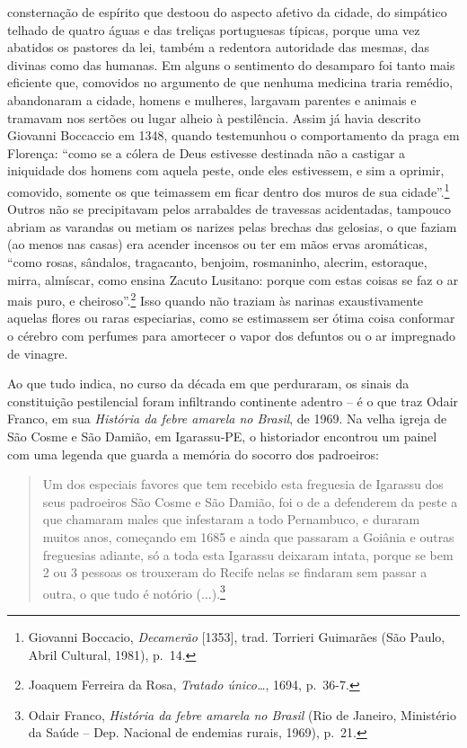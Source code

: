 consternação de espírito que destoou do aspecto afetivo da cidade, do
simpático telhado de quatro águas e das treliças portuguesas típicas,
porque uma vez abatidos os pastores da lei, também a redentora
autoridade das mesmas, das divinas como das humanas. Em alguns o
sentimento do desamparo foi tanto mais eficiente que, comovidos no
argumento de que nenhuma medicina traria remédio, abandonaram a cidade,
homens e mulheres, largavam parentes e animais e tramavam nos sertões ou
lugar alheio à pestilência. Assim já havia descrito Giovanni Boccaccio
em 1348, quando testemunhou o comportamento da praga em Florença: ``como
se a cólera de Deus estivesse destinada não a castigar a iniquidade dos
homens com aquela peste, onde eles estivessem, e sim a oprimir,
comovido, somente os que teimassem em ficar dentro dos muros de sua
cidade''.\footnote{Giovanni Boccacio, \emph{Decamerão} {[}1353{]}, trad.
  Torrieri Guimarães (São Paulo, Abril Cultural, 1981), p.~14.} Outros
não se precipitavam pelos arrabaldes de travessas acidentadas, tampouco
abriam as varandas ou metiam os narizes pelas brechas das gelosias, o
que faziam (ao menos nas casas) era acender incensos ou ter em mãos
ervas aromáticas, ``como rosas, sândalos, tragacanto, benjoim,
rosmaninho, alecrim, estoraque, mirra, almíscar, como ensina Zacuto
Lusitano: porque com estas coisas se faz o ar mais puro, e
cheiroso''.\footnote{Joaquem Ferreira da Rosa, \emph{Tratado
  único\ldots{}}, 1694, p.~36-7.} Isso quando não traziam às narinas
exaustivamente aquelas flores ou raras especiarias, como se estimassem
ser ótima coisa conformar o cérebro com perfumes para amortecer o vapor
dos defuntos ou o ar impregnado de vinagre.

Ao que tudo indica, no curso da década em que perduraram, os sinais da
constituição pestilencial foram infiltrando continente adentro -- é o
que traz Odair Franco, em sua \emph{História da febre amarela no
Brasil}, de 1969. Na velha igreja de São Cosme e São Damião, em
Igarassu-PE, o historiador encontrou um painel com uma legenda que
guarda a memória do socorro dos padroeiros:

\begin{quote}
Um dos especiais favores que tem recebido esta freguesia de Igarassu dos
seus padroeiros São Cosme e São Damião, foi o de a defenderem da peste a
que chamaram males que infestaram a todo Pernambuco, e duraram muitos
anos, começando em 1685 e ainda que passaram a Goiânia e outras
freguesias adiante, só a toda esta Igarassu deixaram intata, porque se
bem 2 ou 3 pessoas os trouxeram do Recife nelas se findaram sem passar a
outra, o que tudo é notório (...).\footnote{Odair Franco, \emph{História
  da febre amarela no Brasil} (Rio de Janeiro, Ministério da Saúde --
  Dep. Nacional de endemias rurais, 1969), p.~21.}
\end{quote}

